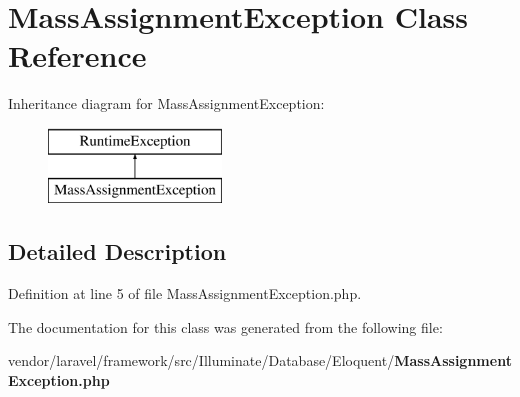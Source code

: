 \section{Mass\+Assignment\+Exception Class Reference}
\label{class_illuminate_1_1_database_1_1_eloquent_1_1_mass_assignment_exception}
Inheritance diagram for Mass\+Assignment\+Exception\+:\begin{figure}[H]
\begin{center}
\leavevmode
\includegraphics[height=2.000000cm]{class_illuminate_1_1_database_1_1_eloquent_1_1_mass_assignment_exception}
\end{center}
\end{figure}


\subsection{Detailed Description}


Definition at line 5 of file Mass\+Assignment\+Exception.\+php.



The documentation for this class was generated from the following file\+:\begin{DoxyCompactItemize}
\item 
vendor/laravel/framework/src/\+Illuminate/\+Database/\+Eloquent/{\bf Mass\+Assignment\+Exception.\+php}\end{DoxyCompactItemize}
